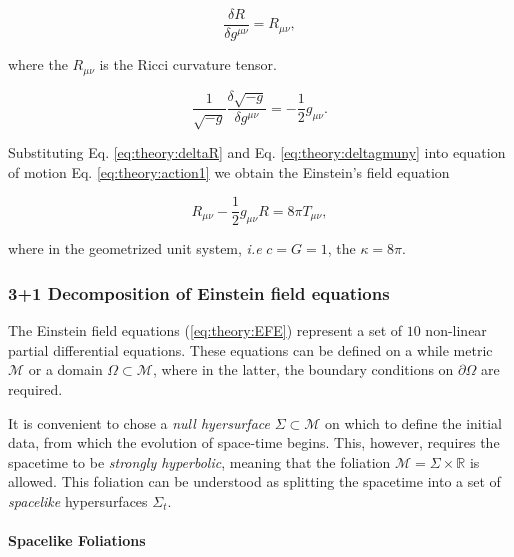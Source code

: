 {    \begin{equation}
        \frac{\delta R}{\delta g^{\mu\nu}} = R_{\mu\nu},
    \label{eq:theory:deltaR}
    \end{equation}
    
    where the $R_{\mu\nu}$ is the Ricci curvature tensor.
    
    \begin{equation}
        \frac{1}{\sqrt{-g}}\frac{\delta\sqrt{-g}}{\delta g^{\mu\nu}} = -\frac{1}{2}g_{\mu\nu}.
    \label{eq:theory:deltagmuny}
    \end{equation}
    
    Substituting Eq. \ref{eq:theory:deltaR} and Eq. \ref{eq:theory:deltagmuny} into equation of motion Eq.  \ref{eq:theory:action1} we obtain the Einstein's field equation 
    
    \begin{equation}
        R_{\mu\nu} -\frac{1}{2}g_{\mu\nu}R=8\pi T_{\mu\nu},
    \label{eq:theory:EFE}
    \end{equation}
    
    where in the geometrized unit system, \textit{i.e} $c=G=1$, the $\kappa=8\pi$.
    
    \subsubsection{3+1 Decomposition of Einstein field equations}
    
    The Einstein field equations (\ref{eq:theory:EFE}) represent a set of $10$ non-linear partial differential equations.
    These equations can be defined on a while metric $\mathcal{M}$ or a domain $\Omega\subset\mathcal{M}$, where in the latter, the boundary conditions on $\partial\Omega$ are required. 
    
    It is convenient to chose a \textit{null hyersurface} $\Sigma\subset\mathcal{M}$ on which to define the initial data, from which the evolution of space-time begins. 
    This, however, requires the spacetime to be \textit{strongly hyperbolic}, meaning that the foliation $\mathcal{M}=\Sigma\times\mathbb{R}$ is allowed. 
    This foliation can be understood as splitting the spacetime into a set of \textit{spacelike} hypersurfaces $\Sigma_t$. 
    
    
    \paragraph{Spacelike Foliations}
    
}
